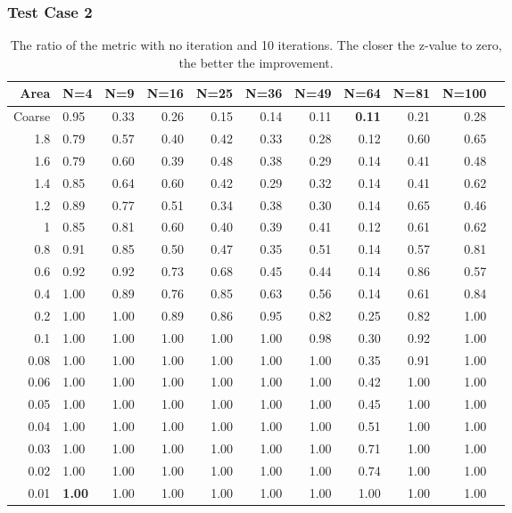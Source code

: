 \documentclass[compress]{beamer}
\begin{document}
\begin{frame}[t]\frametitle{Test Case 2}
\begin{table}[H]
\centering
\tiny
\caption{The ratio  of the metric with no iteration and 10 iterations. The closer the z-value to zero, the better the improvement.} 
\begin{tabular}{rlrrrrrrrrr}
  \hline
  Area & N=4 & N=9 & N=16 & N=25 & N=36 & N=49 & N=64 & N=81 & N=100 \\ 
  \hline
Coarse & 0.95 & 0.33 & 0.26 & 0.15 & 0.14 & 0.11 & \textbf{\cellcolor{blue!25}0.11} & 0.21 & 0.28 \\ 
  1.8 & 0.79 & 0.57 & 0.40 & 0.42 & 0.33 & 0.28 & 0.12 & 0.60 & 0.65 \\ 
1.6 & 0.79 & 0.60 & 0.39 & 0.48 & 0.38 & 0.29 & 0.14 & 0.41 & 0.48 \\ 
 1.4 & 0.85 & 0.64 & 0.60 & 0.42 & 0.29 & 0.32 & 0.14 & 0.41 & 0.62 \\ 
 1.2 & 0.89 & 0.77 & 0.51 & 0.34 & 0.38 & 0.30 & 0.14 & 0.65 & 0.46 \\ 
 1 & 0.85 & 0.81 & 0.60 & 0.40 & 0.39 & 0.41 & 0.12 & 0.61 & 0.62 \\ 
  0.8 & 0.91 & 0.85 & 0.50 & 0.47 & 0.35 & 0.51 & 0.14 & 0.57 & 0.81 \\ 
 0.6 & 0.92 & 0.92 & 0.73 & 0.68 & 0.45 & 0.44 & 0.14 & 0.86 & 0.57 \\ 
 0.4 & 1.00 & 0.89 & 0.76 & 0.85 & 0.63 & 0.56 & 0.14 & 0.61 & 0.84 \\ 
   0.2 & 1.00 & 1.00 & 0.89 & 0.86 & 0.95 & 0.82 & 0.25 & 0.82 & 1.00 \\ 
   0.1 & 1.00 & 1.00 & 1.00 & 1.00 & 1.00 & 0.98 & 0.30 & 0.92 & 1.00 \\ 
 0.08 & 1.00 & 1.00 & 1.00 & 1.00 & 1.00 & 1.00 & 0.35 & 0.91 & 1.00 \\ 
 0.06 & 1.00 & 1.00 & 1.00 & 1.00 & 1.00 & 1.00 & 0.42 & 1.00 & 1.00 \\ 
   0.05 & 1.00 & 1.00 & 1.00 & 1.00 & 1.00 & 1.00 & 0.45 & 1.00 & 1.00 \\ 
   0.04 & 1.00 & 1.00 & 1.00 & 1.00 & 1.00 & 1.00 & 0.51 & 1.00 & 1.00 \\ 
   0.03 & 1.00 & 1.00 & 1.00 & 1.00 & 1.00 & 1.00 & 0.71 & 1.00 & 1.00 \\ 
   0.02 & 1.00 & 1.00 & 1.00 & 1.00 & 1.00 & 1.00 & 0.74 & 1.00 & 1.00 \\ 
 0.01 & \textbf{\cellcolor{blue!25}1.00} & 1.00 & 1.00 & 1.00 & 1.00 & 1.00 & 1.00 & 1.00 & 1.00 \\ 
   \hline
\end{tabular}
\end{table}
\end{frame}
\end{document}
